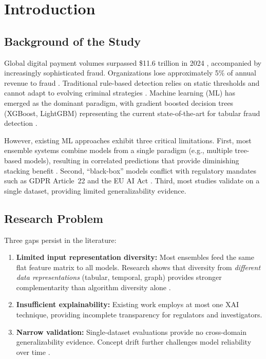 \documentclass[10pt,a4paper,twocolumn]{article}
\begin{document}
\section{Introduction}

\subsection{Background of the Study}

Global digital payment volumes surpassed \$11.6 trillion in 2024 \cite{statista2024}, accompanied by increasingly sophisticated fraud. Organizations lose approximately 5\% of annual revenue to fraud \cite{acfe2024}. Traditional rule-based detection relies on static thresholds and cannot adapt to evolving criminal strategies \cite{abdallah2016}. Machine learning (ML) has emerged as the dominant paradigm, with gradient boosted decision trees (XGBoost, LightGBM) representing the current state-of-the-art for tabular fraud detection \cite{chen2016, ke2017}.

However, existing ML approaches exhibit three critical limitations. First, most ensemble systems combine models from a single paradigm (e.g., multiple tree-based models), resulting in correlated predictions that provide diminishing stacking benefit \cite{dietterich2000}. Second, ``black-box'' models conflict with regulatory mandates such as GDPR Article~22 and the EU AI Act \cite{goodman2017}. Third, most studies validate on a single dataset, providing limited generalizability evidence.

\subsection{Research Problem}

Three gaps persist in the literature:

\begin{enumerate}
    \item \textbf{Limited input representation diversity:} Most ensembles feed the same flat feature matrix to all models. Research shows that diversity from \emph{different data representations} (tabular, temporal, graph) provides stronger complementarity than algorithm diversity alone \cite{dietterich2000}.
    \item \textbf{Insufficient explainability:} Existing work employs at most one XAI technique, providing incomplete transparency for regulators and investigators.
    \item \textbf{Narrow validation:} Single-dataset evaluations provide no cross-domain generalizability evidence. Concept drift further challenges model reliability over time \cite{santos2018}.
\end{enumerate}
\end{document}

